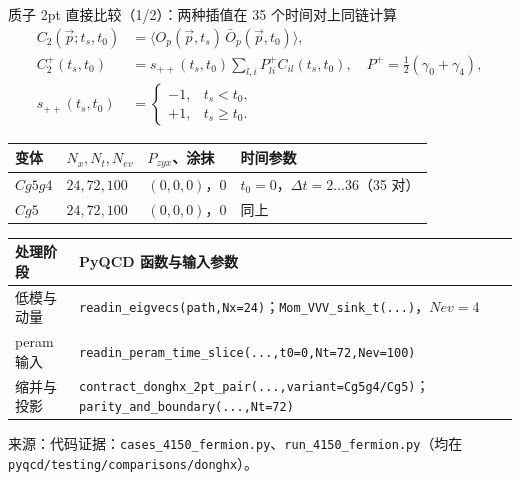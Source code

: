 \documentclass[UTF8,aspectratio=169,11pt]{ctexbeamer}
\newcommand{\source}[1]{\vspace{0.05em}\par{\raggedright\scriptsize\color{muted}来源：#1\par}}
\newcommand{\codepath}[1]{\nolinkurl{#1}}
\begin{document}
\begin{frame}[t]{质子 2pt 直接比较（1/2）：两种插值在 35 个时间对上同链计算}
  \footnotesize
  \setlength{\abovedisplayskip}{0.25em}
  \setlength{\belowdisplayskip}{0.25em}
  \renewcommand{\arraystretch}{0.92}
  \begin{align*}
    C_2(\vec p;t_s,t_0)&=\langle O_p(\vec p,t_s)\,\bar O_p(\vec p,t_0)\rangle,\\
    C_2^{+}(t_s,t_0)&=s_{++}(t_s,t_0)\sum_{l,i}P^+_{li}C_{il}(t_s,t_0),
    \quad P^+=\tfrac12(\gamma_0+\gamma_4),\\
    s_{++}(t_s,t_0)&=\begin{cases}-1,&t_s<t_0,\\+1,&t_s\ge t_0.\end{cases}
  \end{align*}
  \begin{tabularx}{0.96\textwidth}{@{}P{0.13\textwidth} P{0.16\textwidth} P{0.19\textwidth} Y@{}}
    \toprule
    变体 & $N_x,N_t,N_{ev}$ & $P_{zyx}$、涂抹 & 时间参数 \\
    \midrule
    $Cg5g4$ & $24,72,100$ & $(0,0,0)$，$0$ & $t_0=0$，$\Delta t=2\ldots36$（35 对） \\
    $Cg5$ & $24,72,100$ & $(0,0,0)$，$0$ & 同上 \\
    \bottomrule
  \end{tabularx}
  \vspace{0.16em}
  \begin{tabularx}{0.96\textwidth}{@{}P{0.22\textwidth}Y@{}}
    \toprule
    处理阶段 & PyQCD 函数与输入参数 \\
    \midrule
    低模与动量 & \codepath{readin_eigvecs(path,Nx=24)}；\codepath{Mom_VVV_sink_t(...)}，$Nev=4$ \\
    peram 输入 & \codepath{readin_peram_time_slice(...,t0=0,Nt=72,Nev=100)} \\
    缩并与投影 & \codepath{contract_donghx_2pt_pair(...,variant=Cg5g4/Cg5)}；\codepath{parity_and_boundary(...,Nt=72)} \\
    \bottomrule
  \end{tabularx}
  \vspace{-0.65em}
  \source{代码证据：\texttt{cases\_4150\_fermion.py}、\texttt{run\_4150\_fermion.py}（均在 \codepath{pyqcd/testing/comparisons/donghx}）。}
\end{frame}
\end{document}
